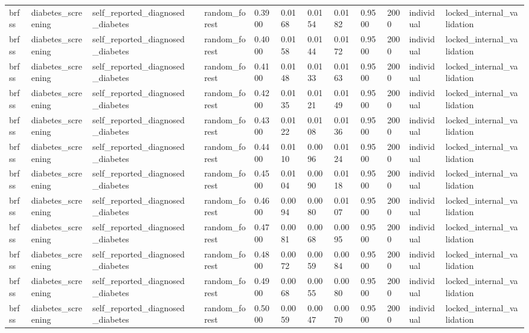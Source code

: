 \begin{tabular}{lllllllllllll}
brfss & diabetes\_screening & self\_reported\_diagnosed\_diabetes &  & random\_forest & 0.3900 & 0.0168 & 0.0154 & 0.0182 & 0.9500 & 2000 & individual & locked\_internal\_validation \\
brfss & diabetes\_screening & self\_reported\_diagnosed\_diabetes &  & random\_forest & 0.4000 & 0.0158 & 0.0144 & 0.0172 & 0.9500 & 2000 & individual & locked\_internal\_validation \\
brfss & diabetes\_screening & self\_reported\_diagnosed\_diabetes &  & random\_forest & 0.4100 & 0.0148 & 0.0133 & 0.0163 & 0.9500 & 2000 & individual & locked\_internal\_validation \\
brfss & diabetes\_screening & self\_reported\_diagnosed\_diabetes &  & random\_forest & 0.4200 & 0.0135 & 0.0121 & 0.0149 & 0.9500 & 2000 & individual & locked\_internal\_validation \\
brfss & diabetes\_screening & self\_reported\_diagnosed\_diabetes &  & random\_forest & 0.4300 & 0.0122 & 0.0108 & 0.0136 & 0.9500 & 2000 & individual & locked\_internal\_validation \\
brfss & diabetes\_screening & self\_reported\_diagnosed\_diabetes &  & random\_forest & 0.4400 & 0.0110 & 0.0096 & 0.0124 & 0.9500 & 2000 & individual & locked\_internal\_validation \\
brfss & diabetes\_screening & self\_reported\_diagnosed\_diabetes &  & random\_forest & 0.4500 & 0.0104 & 0.0090 & 0.0118 & 0.9500 & 2000 & individual & locked\_internal\_validation \\
brfss & diabetes\_screening & self\_reported\_diagnosed\_diabetes &  & random\_forest & 0.4600 & 0.0094 & 0.0080 & 0.0107 & 0.9500 & 2000 & individual & locked\_internal\_validation \\
brfss & diabetes\_screening & self\_reported\_diagnosed\_diabetes &  & random\_forest & 0.4700 & 0.0081 & 0.0068 & 0.0095 & 0.9500 & 2000 & individual & locked\_internal\_validation \\
brfss & diabetes\_screening & self\_reported\_diagnosed\_diabetes &  & random\_forest & 0.4800 & 0.0072 & 0.0059 & 0.0084 & 0.9500 & 2000 & individual & locked\_internal\_validation \\
brfss & diabetes\_screening & self\_reported\_diagnosed\_diabetes &  & random\_forest & 0.4900 & 0.0068 & 0.0055 & 0.0080 & 0.9500 & 2000 & individual & locked\_internal\_validation \\
brfss & diabetes\_screening & self\_reported\_diagnosed\_diabetes &  & random\_forest & 0.5000 & 0.0059 & 0.0047 & 0.0070 & 0.9500 & 2000 & individual & locked\_internal\_validation \\

\end{tabular}
